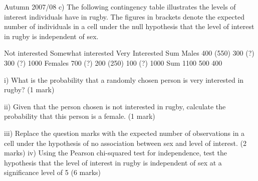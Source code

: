 Autumn 2007/08
c) The following contingency table illustrates the levels of interest individuals have in rugby. The figures in brackets denote the expected number of individuals in a cell under the null hypothesis that the level of interest in rugby is independent of sex.

	Not interested	Somewhat interested	Very Interested	Sum
Males	400 (550)	300 (?)	300 (?)	1000
Females	700 (?)	200 (250)	100 (?)	1000
Sum	1100	500	400	

i) What is the probability that a randomly chosen person is very interested in rugby?                                                                  
  (1 mark) 

ii) Given that the person chosen is not interested in rugby, calculate the probability that this person is a female.                                                                                      
 (1 mark)

iii) Replace the question marks with the expected number of observations in a cell under the hypothesis of no association between sex and level of interest.                                                                        
  (2 marks) 
iv) Using the Pearson chi-squared test for independence, test the hypothesis that the level of interest in rugby is independent of sex at a significance level of 5%
                             (6 marks)

